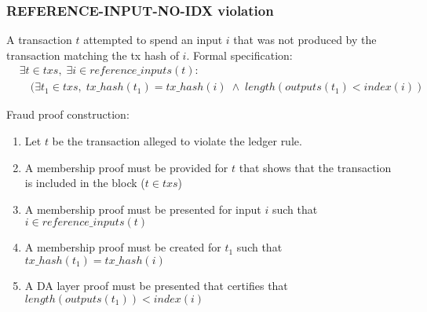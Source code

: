 \documentclass[../midgard.tex]{subfiles}
\begin{document}
\subsubsection{REFERENCE-INPUT-NO-IDX violation}
\label{violation:REFERENCE-INPUT-NO-IDX}
A transaction $t$ attempted to spend an input $i$ that was not produced by the transaction matching the tx hash of $i$.
Formal specification:
\begin{equation*}
\begin{split}
  &\exists t \in txs,\; \exists i \in reference\_inputs(t): \\
    &\quad( \exists t_1 \in txs,\;
      tx\_hash(t_1) = tx\_hash(i) \;\land\;
      length(outputs(t_1) <  index(i) )
\end{split}
\end{equation*}

Fraud proof construction:
\begin{enumerate}
  \item Let $t$ be the transaction alleged to violate the ledger rule. 
  \item A membership proof must be provided for $t$ that shows that the transaction is included in the block ($t \in txs$)
  \item A membership proof must be presented for input $i$ such that $i \in reference\_inputs(t)$
  \item A membership proof must be created for $t_1$ such that $tx\_hash(t_1) = tx\_hash(i)$
  \item A DA layer proof must be presented that certifies that $length(outputs(t_1)) < index(i)$
\end{enumerate}







\end{document}
